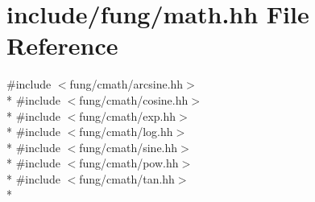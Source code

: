 \hypertarget{math_8hh}{\section{include/fung/math.hh File Reference}
\label{math_8hh}
}
{\ttfamily \#include $<$fung/cmath/arcsine.\-hh$>$}\\*
{\ttfamily \#include $<$fung/cmath/cosine.\-hh$>$}\\*
{\ttfamily \#include $<$fung/cmath/exp.\-hh$>$}\\*
{\ttfamily \#include $<$fung/cmath/log.\-hh$>$}\\*
{\ttfamily \#include $<$fung/cmath/sine.\-hh$>$}\\*
{\ttfamily \#include $<$fung/cmath/pow.\-hh$>$}\\*
{\ttfamily \#include $<$fung/cmath/tan.\-hh$>$}\\*
